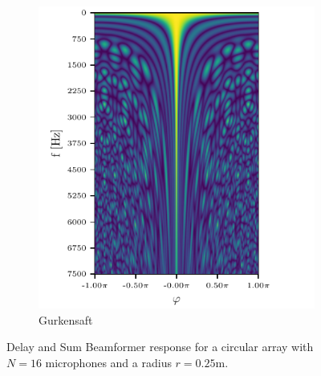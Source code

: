 \begin{figure}[h]
\begin{subfigure}[t]{0.45\textwidth}
		\includegraphics[width=\textwidth]{circ_f_sweep_1.pdf}
		\caption{Gurkensaft} 
		\label{ssl:fig:f_dep1}
	\end{subfigure}
	\caption{Delay and Sum Beamformer response for a circular array with $N=16$ microphones 
	and a radius $r = 0.25$m. }
	\label{ssl:fig:f_deps}
\end{figure}


